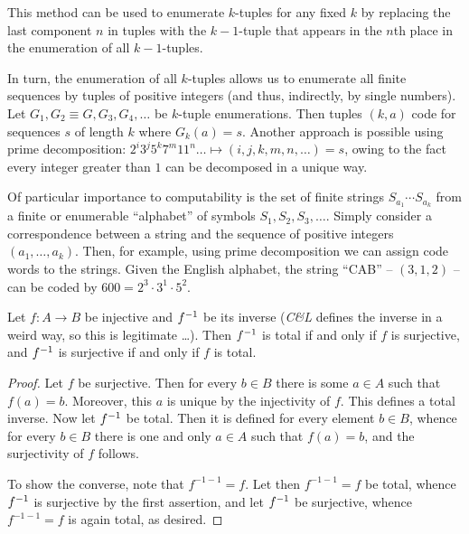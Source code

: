 This method can be used to enumerate $k$-tuples for any fixed $k$ by replacing the last component $n$ in tuples with the $k-1$-tuple that appears in the $n$th place in the enumeration of all $k-1$-tuples.

In turn, the enumeration of all $k$-tuples allows us to enumerate all finite sequences by tuples of positive integers (and thus, indirectly, by single numbers).
Let $G_1, G_2 \equiv G, G_3, G_4, \ldots$ be $k$-tuple enumerations.
Then tuples $(k, a)$ code for sequences $s$ of length $k$ where $G_k(a) = s$.
Another approach is possible using prime decomposition: $2^i3^j5^k7^m11^n\ldots \mapsto (i,j,k,m,n,\ldots) = s$, owing to the fact every integer greater than $1$ can be decomposed in a unique way.

Of particular importance to computability is the set of finite strings $S_{a_1} \cdots S_{a_k}$ from a finite or enumerable ``alphabet'' of symbols $S_1, S_2, S_3, \ldots$.
Simply consider a correspondence between a string and the sequence of positive integers $(a_1,\ldots,a_k)$.
Then, for example, using prime decomposition we can assign code words to the strings.
Given the English alphabet, the string ``CAB'' -- $(3,1,2)$ -- can be coded by $600 = 2^3 \cdot 3^1 \cdot 5^2$.


\begin{exercise}[1.1]
  Let $f\colon A \to B$ be injective and $f^{-1}$ be its inverse (\emph{C\&L} defines the inverse in a weird way, so this is legitimate \ldots).
  Then $f^{-1}$ is total if and only if $f$ is surjective, and $f^{-1}$ is surjective if and only if $f$ is total.
\end{exercise}
\begin{proof}
  Let $f$ be surjective.
  Then for every $b \in B$ there is some $a \in A$ such that $f(a) = b$.
  Moreover, this $a$ is unique by the injectivity of $f$.
  This defines a total inverse.
  Now let $f^{-1}$ be total.
  Then it is defined for every element $b \in B$, whence for every $b \in B$ there is one and only $a \in A$ such that $f(a) = b$, and the surjectivity of $f$ follows.

  To show the converse, note that $f^{-1-1} = f$.
  Let then $f^{-1-1} = f$ be total, whence $f^{-1}$ is surjective by the first assertion, and let $f^{-1}$ be surjective, whence $f^{-1-1} = f$ is again total, as desired.
\end{proof}

